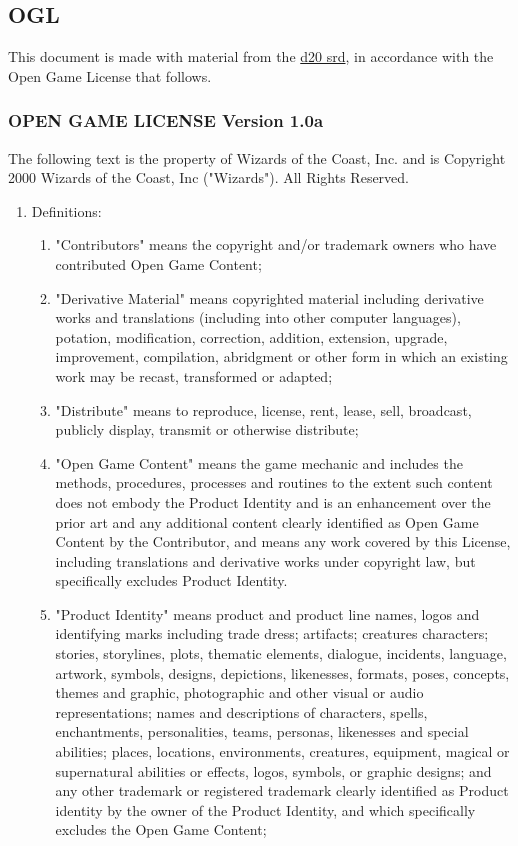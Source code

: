 \subsection{OGL}
This document is made with material from the \href{http://www.wizards.com/default.asp?x=d20/article/srd35}{d20 srd},
in accordance with the Open Game License that follows.
\subsubsection{OPEN GAME LICENSE Version 1.0a}
\label{sec:OGL}
\small
The following text is the property of Wizards of the Coast, Inc. and is Copyright 2000 Wizards of the Coast, Inc ("Wizards"). All Rights Reserved.

\begin{enumerate}\item Definitions: 
\begin{enumerate}
 \item "Contributors" means the copyright and/or trademark owners who have contributed Open Game Content;
 \item "Derivative Material" means copyrighted material including derivative works and translations (including into other computer languages), potation, modification, correction, addition, extension, upgrade, improvement, compilation, abridgment or other form in which an existing work may be recast, transformed or adapted;
 \item "Distribute" means to reproduce, license, rent, lease, sell, broadcast, publicly display, transmit or otherwise distribute; 
 \item "Open Game Content" means the game mechanic and includes the methods, procedures, processes and routines to the extent such content does not embody the Product Identity and is an enhancement over the prior art and any additional content clearly identified as Open Game Content by the Contributor, and means any work covered by this License, including translations and derivative works under copyright law, but specifically excludes Product Identity.
 \item "Product Identity" means product and product line names, logos and identifying marks including trade dress; artifacts; creatures characters; stories, storylines, plots, thematic elements, dialogue, incidents, language, artwork, symbols, designs, depictions, likenesses, formats, poses, concepts, themes and graphic, photographic and other visual or audio representations; names and descriptions of characters, spells, enchantments, personalities, teams, personas, likenesses and special abilities; places, locations, environments, creatures, equipment, magical or supernatural abilities or effects, logos, symbols, or graphic designs; and any other trademark or registered trademark clearly identified as Product identity by the owner of the Product Identity, and which specifically excludes the Open Game Content;

\end{enumerate}
\end{enumerate}
